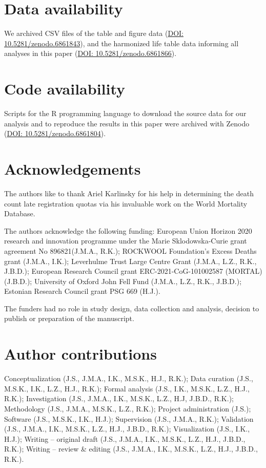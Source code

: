 \documentclass[12pt]{article}
\begin{document}
\clearpage

\section*{Data availability}

We archived CSV files of the table and figure data (\href{https://zenodo.org/record/6861843}{DOI: 10.5281/zenodo.6861843}), and the harmonized life table data informing all analyses in this paper (\href{https://zenodo.org/record/6861866}{DOI: 10.5281/zenodo.6861866}).

\section*{Code availability}

Scripts for the R programming language to download the source data for our analysis and to reproduce the results in this paper were archived with Zenodo (\href{https://zenodo.org/record/6861804}{DOI: 10.5281/zenodo.6861804}).

\section*{Acknowledgements}

The authors like to thank Ariel Karlinsky for his help in determining the death count late registration quotas via his invaluable work on the World Mortality Database.

The authors acknowledge the following funding: European Union Horizon 2020 research and innovation programme under the Marie Sklodowska-Curie grant agreement No 896821(J.M.A., R.K.); ROCKWOOL Foundation's Excess Deaths grant (J.M.A., I.K.); Leverhulme Trust Large Centre Grant (J.M.A., L.Z., R.K., J.B.D.); European Research Council grant ERC-2021-CoG-101002587 (MORTAL) (J.B.D.); University of Oxford John Fell Fund (J.M.A., L.Z., R.K., J.B.D.); Estonian Research Council grant PSG 669 (H.J.).

The funders had no role in study design, data collection and analysis, decision to publish or preparation of the manuscript.

\section*{Author contributions}

Conceptualization (J.S., J.M.A., I.K., M.S.K., H.J., R.K.); Data curation (J.S., M.S.K., I.K., L.Z., H.J., R.K.); Formal analysis (J.S., I.K., M.S.K., L.Z., H.J., R.K.); Investigation (J.S., J.M.A., I.K., M.S.K., L.Z., H.J, J.B.D., R.K.); Methodology (J.S., J.M.A., M.S.K., L.Z., R.K.); Project administration (J.S.); Software (J.S., M.S.K., I.K., H.J.); Supervision (J.S., J.M.A., R.K.); Validation (J.S., J.M.A., I.K., M.S.K., L.Z., H.J., J.B.D., R.K.); Visualization (J.S., I.K., H.J.); Writing -- original draft (J.S., J.M.A., I.K., M.S.K., L.Z., H.J., J.B.D., R.K.); Writing -- review  \& editing (J.S., J.M.A., I.K., M.S.K., L.Z., H.J., J.B.D., R.K.).
\end{document}
